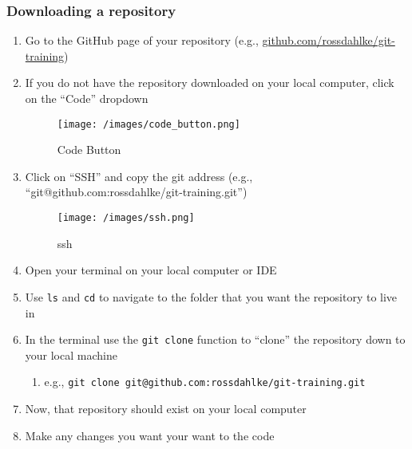 \documentclass[
  letterpaper,
  DIV=11,
  numbers=noendperiod]{scrartcl}
\providecommand{\tightlist}{%
  \setlength{\itemsep}{0pt}\setlength{\parskip}{0pt}}\usepackage{longtable,booktabs,array}
\begin{document}
\hypertarget{downloading-a-repository}{%
\subsubsection{Downloading a
repository}\label{downloading-a-repository}}

\begin{enumerate}
\def\labelenumi{\arabic{enumi}.}
\item
  Go to the GitHub page of your repository (e.g.,
  \url{github.com/rossdahlke/git-training})
\item
  If you do not have the repository downloaded on your local computer,
  click on the ``Code'' dropdown

  \begin{figure}

  {\centering \texttt{[image: /images/code\_button.png]}

  }

  \caption{Code Button}

  \end{figure}
\item
  Click on ``SSH'' and copy the git address (e.g.,
  ``git@github.com:rossdahlke/git-training.git'')

  \begin{figure}

  {\centering \texttt{[image: /images/ssh.png]}

  }

  \caption{ssh}

  \end{figure}
\item
  Open your terminal on your local computer or IDE
\item
  Use \texttt{ls} and \texttt{cd} to navigate to the folder that you
  want the repository to live in
\item
  In the terminal use the \texttt{git\ clone} function to ``clone'' the
  repository down to your local machine

  \begin{enumerate}
  \def\labelenumii{\arabic{enumii}.}
  \tightlist
  \item
    e.g.,
    \texttt{git\ clone\ git@github.com:rossdahlke/git-training.git}
  \end{enumerate}
\item
  Now, that repository should exist on your local computer
\item
  Make any changes you want your want to the code
\end{enumerate}
\end{document}
